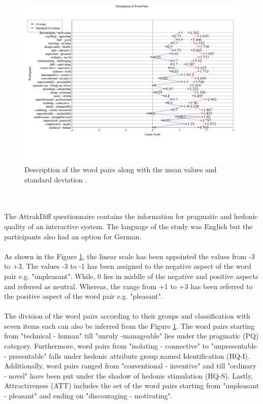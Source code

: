 \begin{figure}[!h]
    \centering
    \includegraphics[width=1\textwidth]{img/Desc_of_Word_Pairs.png}
    \caption{Description of the word pairs along with the mean values and standard deviation \cite{attrakdiff}.}
    \label{fig:descofWordPair}
\end{figure}
\\~\\
The AttrakDiff questionnaire contains the information for pragmatic and hedonic quality of an interactive system. The language of the study was English but the participants also had an option for German.
\\~\\
As shown in the Figure \ref{fig:descofWordPair}, the linear scale has been appointed the values from -3 to +3. The values -3 to -1 has been assigned to the negative aspect of the word pair e.g. "unpleasant". While, 0 lies in middle of the negative and positive aspects and referred as neutral. Whereas, the range from +1 to +3 has been referred to the positive aspect of the word pair e.g. "pleasant".
\\~\\
The division of the word pairs according to their groups and classification with seven items each can also be inferred from the Figure \ref{fig:descofWordPair}. The word pairs starting from "technical - human" till "unruly -manageable" lies under the pragmatic (PQ) category. Furthermore, word pairs from "isolating - connective" to "unpresentable - presentable" falls under hedonic attribute group named Identification (HQ-I). Additionally, word pairs ranged from "conventional - inventive" and till "ordinary - novel" have been put under the shadow of hedonic stimulation (HQ-S). Lastly, Attractiveness (ATT) includes the set of the word pairs starting from "unpleasant - pleasant" and ending on "discouraging - motivating". 
